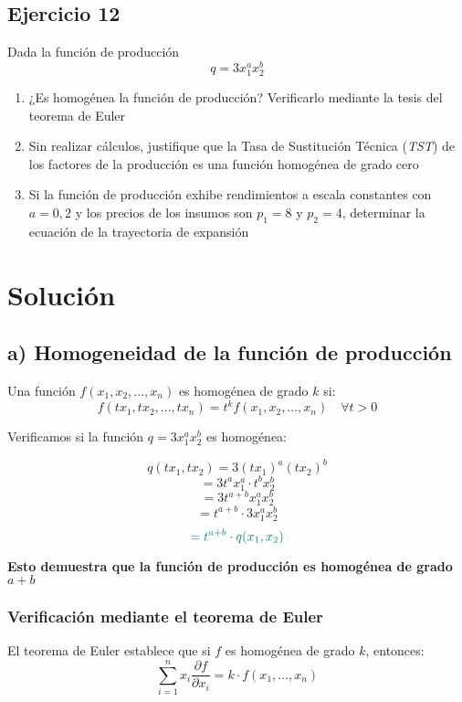 \documentclass{article}
\begin{document}
\newpage
\subsection{Ejercicio 12}

Dada la función de producción
\[
q = 3x_1^a x_2^b
\]
\begin{enumerate}
  \item ¿Es homogénea la función de producción? Verificarlo mediante la tesis del teorema de Euler
  \item Sin realizar cálculos, justifique que la Tasa de Sustitución Técnica (\textit{TST}) de los factores de la producción es una función homogénea de grado cero
  \item Si la función de producción exhibe rendimientos a escala constantes con \(a = 0{,}2\) y los precios de los insumos son \(p_1 = 8\) y \(p_2 = 4\), determinar la ecuación de la trayectoria de expansión
\end{enumerate}

\newpage
\section*{Solución}

\subsection*{a) Homogeneidad de la función de producción}

Una función \(f(x_1,x_2,...,x_n)\) es homogénea de grado \(k\) si:
\[
f(tx_1,tx_2,...,tx_n) = t^k f(x_1,x_2,...,x_n) \quad \forall t > 0
\]

Verificamos si la función \(q = 3x_1^a x_2^b\) es homogénea:

\[
q(tx_1,tx_2) = 3(tx_1)^a (tx_2)^b
\]
\[
= 3t^a x_1^a \cdot t^b x_2^b
\]
\[
= 3t^{a+b}x_1^a x_2^b
\]
\[
= t^{a+b} \cdot 3x_1^a x_2^b
\]
\[
\color{teal}
= t^{a+b} \cdot q(x_1,x_2)
\]

\textbf{\color{teal}Esto demuestra que la función de producción es homogénea de grado \(a+b\)}

\subsubsection*{Verificación mediante el teorema de Euler}

El teorema de Euler establece que si \(f\) es homogénea de grado \(k\), entonces:
\[
\sum_{i=1}^{n} x_i \frac{\partial f}{\partial x_i} = k \cdot f(x_1,...,x_n)
\]
\end{document}
